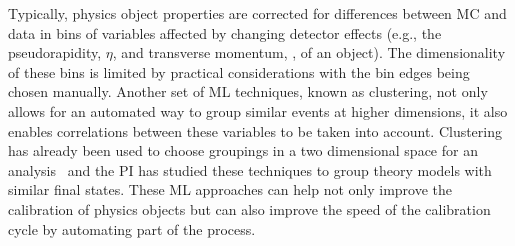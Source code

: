 \documentclass[letter, USenglish, 11pt, subfigure]{article}
\begin{document}


Typically, physics object properties are corrected for differences between MC and data in bins of variables affected by changing detector effects (e.g., the pseudorapidity, $\eta$, and transverse momentum, \pt, of an object). The dimensionality of these bins is limited by practical considerations with the bin edges being chosen manually. Another set of ML techniques, known as clustering, not only allows for an automated way to group similar events at higher dimensions, it also enables correlations between these variables to be taken into account. Clustering has already been used to choose groupings in a two dimensional space for an analysis~\cite{ttH_tau_CMS} and the PI has studied these techniques to group theory models with similar final states. These ML approaches can help not only improve the calibration of physics objects but can also improve the speed of the calibration cycle by automating part of the process.
\end{document}
